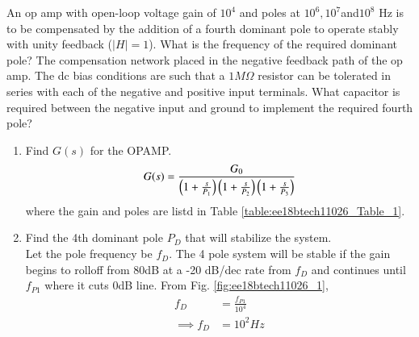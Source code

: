 An op amp with open-loop voltage gain of $10^{4}$ and poles at $10^{6},10^{7} $and$ 10^{8}$ Hz is to be compensated by the addition of a fourth dominant pole to operate stably with unity feedback ($|H| = 1$). What is the frequency of the required dominant pole? The compensation network placed in the negative feedback path of the op amp. The dc bias conditions are such that a $1M\Omega$ resistor can be tolerated in series with each of the negative and positive input terminals. What capacitor is required between the negative input and ground to implement the required fourth pole?
\begin{enumerate}[label=\arabic*.,ref=\theenumi]

\item Find $G(s)$ for the OPAMP.
\\
\solution
\begin{align}
G(s) = \frac{G_0}{\left(1+\frac{s}{P_{1}}\right)\left(1+\frac{s}{P_{2}}\right)\left(1+\frac{s}{P_{3}}\right)}
\end{align}
%
where the gain and poles are listd in Table \ref{table:ee18btech11026_Table_1}.
%
\begin{table}[!ht]
\centering

\caption{}
\label{table:ee18btech11026_Table_1}
\end{table}
%
\item Find the 4th dominant pole $P_D$ that will stabilize the system.
\\
\solution Let the pole frequency be $f_D$.  The 4 pole system will be stable if 
 the gain begins to rolloff from 80dB at a -20 dB/dec rate  from $f_{D}$ and continues  until $f_{P1}$ where it cuts 0dB line. From Fig. \ref{fig:ee18btech11026_1}, 
\begin{align}
f_{D} &= \frac{f_{P1}}{10^{4}}\\
\implies f_{D} &= 10^{2} Hz
\end{align}  


\end{enumerate}
